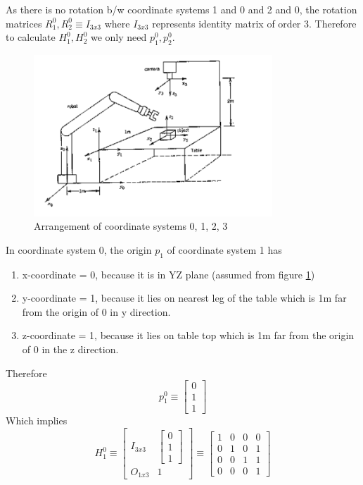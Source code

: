 \documentclass[12pt]{article}
\begin{document}
As there is no rotation b/w coordinate systems 1 and 0 and 2 and 0, the rotation matrices $ R_{1}^{0}, R_{2}^{0} \equiv I_{3x3} $ where $ I_{3x3} $ represents identity matrix of order 3. Therefore to calculate $ H_{1}^{0}, H_{2}^{0} $ we only need $ p_{1}^{0}, p_{2}^{0} $.

\begin{figure}[h]
  \centering
  \includegraphics[width=0.8\textwidth]{p4-fig.png}
  \caption{Arrangement of coordinate systems 0, 1, 2, 3}
  \label{fig:p4}
\end{figure}

In coordinate system 0, the origin $ p_{1} $ of coordinate system 1 has
\begin{enumerate}[nolistsep]
  \item x-coordinate = 0, because it is in YZ plane (assumed from figure \ref{fig:p4})
  \item y-coordinate = 1, because it lies on nearest leg of the table which is 1m far from the origin of 0 in y direction.
  \item z-coordinate = 1, because it lies on table top which is 1m far from the origin of 0 in the z direction.
\end{enumerate}
Therefore
\[
  p_{1}^{0} \equiv \begin{bmatrix} 0 \\ 1 \\ 1 \end{bmatrix}
\]
Which implies
\[
  H_{1}^{0}
  \equiv \begin{bmatrix} I_{3x3} & \begin{bmatrix} 0 \\ 1 \\ 1 \end{bmatrix} \\ O_{1x3} & 1 \end{bmatrix}
  \equiv \begin{bmatrix}
          1 & 0 & 0 & 0\\
          0 & 1 & 0 & 1\\
          0 & 0 & 1 & 1\\
          0 & 0 & 0 & 1
        \end{bmatrix}
\]
\end{document}
